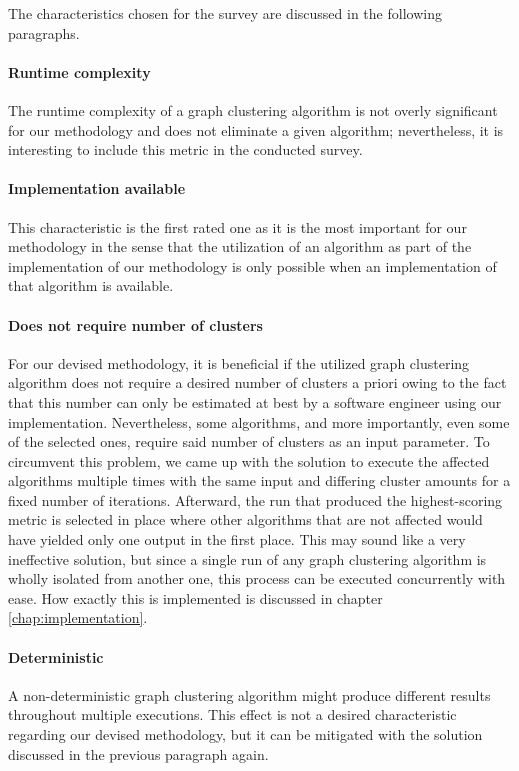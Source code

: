 \documentclass[12pt,a4paper]{report}
\begin{document}
The characteristics chosen for the survey are discussed in the following paragraphs.

\paragraph{Runtime complexity}
The runtime complexity of a graph clustering
algorithm is not overly significant for our methodology and does not eliminate
a given algorithm; nevertheless, it is interesting to include this metric in
the conducted survey.

\paragraph{Implementation available}
This characteristic is the first rated one
as it is the most important for our methodology in the sense that the
utilization of an algorithm as part of the implementation of our methodology is
only possible when an implementation of that algorithm is available.

\paragraph{Does not require number of clusters} \label{graph-clustering-algorithm-survey-amount-of-clusters}
For our devised methodology, it is
beneficial if the utilized graph clustering algorithm does not require a
desired number of clusters a priori owing to the fact that this number can only
be estimated at best by a software engineer using our implementation.
Nevertheless, some algorithms, and more importantly, even some of the selected
ones, require said number of clusters as an input parameter. To circumvent this
problem, we came up with the solution to execute the affected algorithms
multiple times with the same input and differing cluster amounts for a fixed
number of iterations. Afterward, the run that produced the highest-scoring
metric is selected in place where other algorithms that are not affected would
have yielded only one output in the first place. This may sound like a very
ineffective solution, but since a single run of any graph clustering algorithm
is wholly isolated from another one, this process can be executed concurrently
with ease. How exactly this is implemented is discussed in chapter
\ref{chap:implementation}.

\paragraph{Deterministic}
A non\hyp deterministic graph clustering algorithm
might produce different results throughout multiple executions. This effect is
not a desired characteristic regarding our devised methodology, but it can be
mitigated with the solution discussed in the previous paragraph again.
\end{document}
